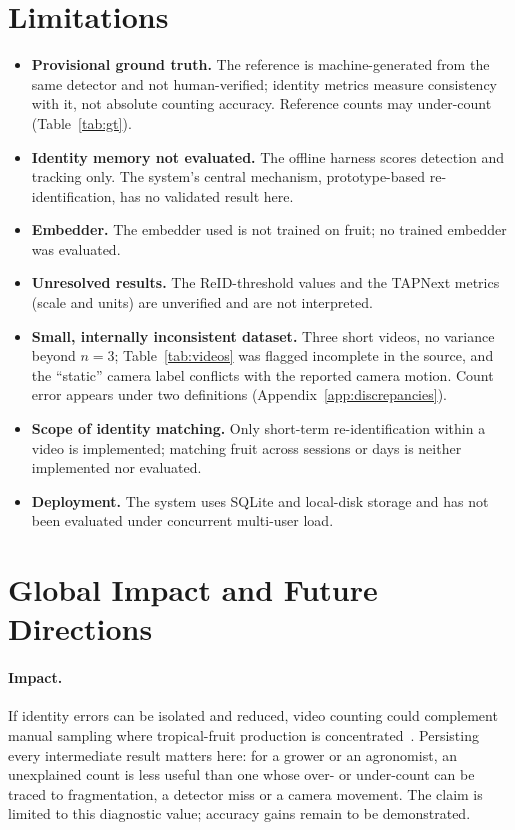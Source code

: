 \documentclass[11pt,a4paper]{article}
\begin{document}
\section{Limitations}\label{sec:limits}
\begin{itemize}
\item \textbf{Provisional ground truth.} The reference is machine-generated from the same detector and not human-verified; identity metrics measure consistency with it, not absolute counting accuracy. Reference counts may under-count (Table~\ref{tab:gt}).
\item \textbf{Identity memory not evaluated.} The offline harness scores detection and tracking only. The system's central mechanism, prototype-based re-identification, has no validated result here.
\item \textbf{Embedder.} The embedder used is not trained on fruit; no trained embedder was evaluated.
\item \textbf{Unresolved results.} The ReID-threshold values and the TAPNext metrics (scale and units) are unverified and are not interpreted.
\item \textbf{Small, internally inconsistent dataset.} Three short videos, no variance beyond $n=3$; Table~\ref{tab:videos} was flagged incomplete in the source, and the ``static'' camera label conflicts with the reported camera motion. Count error appears under two definitions (Appendix~\ref{app:discrepancies}).
\item \textbf{Scope of identity matching.} Only short-term re-identification within a video is implemented; matching fruit across sessions or days is neither implemented nor evaluated.
\item \textbf{Deployment.} The system uses SQLite and local-disk storage and has not been evaluated under concurrent multi-user load.
\end{itemize}

\section{Global Impact and Future Directions}\label{sec:future}

\paragraph{Impact.} If identity errors can be isolated and reduced, video counting could complement manual sampling where tropical-fruit production is concentrated~\cite{fao_tropical}. Persisting every intermediate result matters here: for a grower or an agronomist, an unexplained count is less useful than one whose over- or under-count can be traced to fragmentation, a detector miss or a camera movement. The claim is limited to this diagnostic value; accuracy gains remain to be demonstrated.
\end{document}
